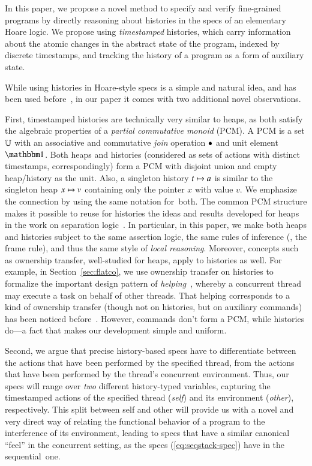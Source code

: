 In this paper, we propose a novel method to specify and verify
fine-grained programs by directly reasoning about histories in the
specs of an elementary Hoare logic. We propose using
\emph{timestamped} histories, which carry information about the atomic
changes in the abstract state of the program, indexed by discrete
timestamps, and tracking the history of a program as a form of
auxiliary state.

While using histories in Hoare-style specs is a simple and natural
idea, and has been used
before~\cite{Bell-al:SAS10,Fu-al:CONCUR10,Gotsman-al:ESOP13}, in our
paper it comes with two additional novel observations.

First, timestamped histories are technically very similar to heaps, as
both satisfy the algebraic properties of a \emph{partial commutative
  monoid} (PCM). A PCM is a set $\mathbb{U}$ with an associative and
commutative \emph{join} operation $\bullet$ and unit element
$\pcmU$. Both heaps and histories (considered as sets of actions with
distinct timestamps, correspondingly) form a PCM with disjoint union
and empty heap/history as the unit. Also, a singleton history $t \mapsto
a$ is similar to the singleton heap $x \mapsto v$ containing only the
pointer $x$ with value $v$.
%
We emphasize the connection by using the same notation for~both.
%
The common PCM structure makes it possible to reuse for histories the
ideas and results developed for heaps in the work on separation
logic~\cite{Calcagno-al:LICS07}. In particular, in this paper, we make
both heaps and histories subject to the same assertion logic, the same
rules of inference (\eg, the frame rule), and thus the same style of
\emph{local reasoning}. Moreover, concepts such as ownership transfer,
well-studied for heaps, apply to histories as well. For example, in
Section~\ref{sec:flatco}, we use ownership transfer on histories to
formalize the important design pattern of
\emph{helping}~\cite{Hendler-al:SPAA10}, whereby a concurrent thread
may execute a task on behalf of other threads. That helping
corresponds to a kind of ownership transfer (though not on histories,
but on auxiliary commands) has been noticed
before~\cite{Turon-al:POPL13,Liang-Feng:PLDI13}.  However, commands
don't form a PCM, while histories do---a fact that makes our
development simple and uniform.

Second, we argue that precise history-based specs have to
differentiate between the actions that have been performed by the
specified thread, from the actions that have been performed by the
thread's concurrent environment. Thus, our specs will range over
\emph{two} different history-typed variables, capturing the
timestamped actions of the specified thread (\emph{self}) and its
environment (\emph{other}), respectively. This split between self and
other will provide us with a novel and very direct way of relating the
functional behavior of a program to the interference of its
environment, leading to specs that have a similar canonical ``feel''
in the concurrent setting, as the specs (\ref{eq:seqstack-spec}) have
in the sequential~one.

